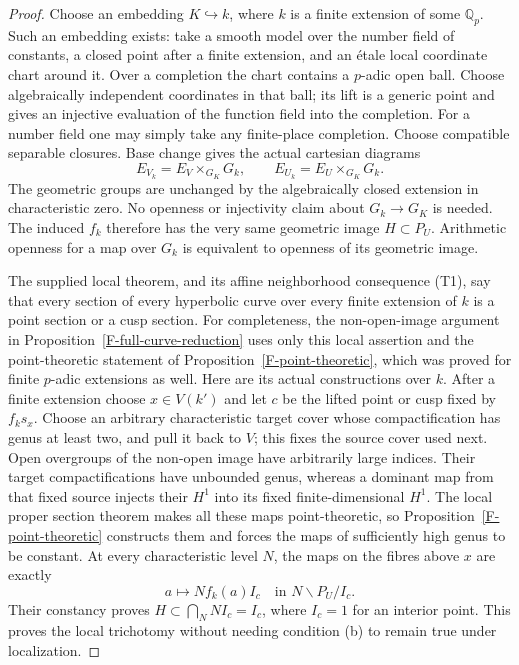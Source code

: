 \documentclass[11pt,oneside]{article}
\begin{document}
\begin{proof}
Choose an embedding $K\hookrightarrow k$, where $k$ is a
finite extension of some $\mathbb Q_p$. Such an embedding
exists: take a smooth model over the number field of constants,
a closed point after a finite extension, and an \'etale local
coordinate chart around it. Over a completion the chart contains
a $p$-adic open ball. Choose algebraically independent coordinates
in that ball; its lift is a generic point and gives an injective
evaluation of the function field into the completion. For a
number field one may simply take any finite-place completion.
Choose compatible separable closures. Base change gives the
actual cartesian
diagrams
\[
 E_{V_k}=E_V\times_{G_K}G_k,\qquad
 E_{U_k}=E_U\times_{G_K}G_k.
\]
The geometric groups are unchanged by the algebraically closed
extension in characteristic zero. No openness or injectivity
claim about $G_k\to G_K$ is needed. The induced $f_k$ therefore
has the very same geometric image $H\subset P_U$. Arithmetic
openness for a map over $G_k$ is equivalent to openness of its
geometric image.

The supplied local theorem, and its affine neighborhood
consequence (T1), say that every section of every hyperbolic
curve over every finite extension of $k$ is a point section or
a cusp section. For completeness, the non-open-image argument
in Proposition~\ref{F-full-curve-reduction} uses only this
local assertion and the point-theoretic statement of
Proposition~\ref{F-point-theoretic}, which was proved for
finite $p$-adic extensions as well. Here are its actual
constructions over $k$. After a finite extension choose
$x\in V(k')$ and let $c$ be the lifted point or cusp fixed
by $f_k s_x$. Choose an arbitrary characteristic target cover
whose compactification has genus at least two, and pull it
back to $V$; this fixes the source cover used next. Open
overgroups of the non-open image have arbitrarily large
indices. Their target compactifications have unbounded genus,
whereas a dominant map from that fixed source injects their
$H^1$ into its fixed finite-dimensional $H^1$. The local
proper section theorem makes all these maps point-theoretic,
so Proposition~\ref{F-point-theoretic} constructs them and
forces the maps of sufficiently high genus to be constant.
At every characteristic level $N$, the maps on the fibres
above $x$ are exactly
\[
 a\longmapsto N f_k(a) I_c\quad\text{in }N\backslash P_U/I_c.
\]
Their constancy proves $H\subset\bigcap_NNI_c=I_c$, where
$I_c=1$ for an interior point. This proves the local trichotomy
without needing condition (b) to remain true under localization.


\end{proof}
\end{document}
